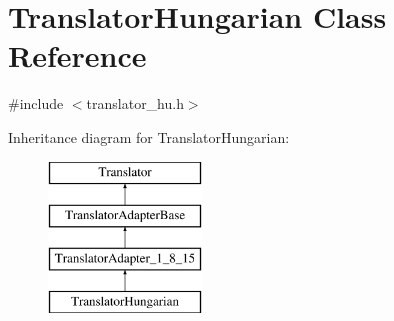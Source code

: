 \hypertarget{class_translator_hungarian}{}\section{Translator\+Hungarian Class Reference}
\label{class_translator_hungarian}


{\ttfamily \#include $<$translator\+\_\+hu.\+h$>$}

Inheritance diagram for Translator\+Hungarian\+:\begin{figure}[H]
\begin{center}
\leavevmode
\includegraphics[height=4.000000cm]{class_translator_hungarian}
\end{center}
\end{figure}
